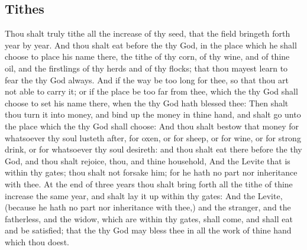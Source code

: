 \begin{biblechapter}
\section*{Tithes}
\verse Thou shalt truly tithe all the increase of thy seed, that the field bringeth forth year by year.
\verse And thou shalt eat before the \LORD thy God, in the place which he shall choose to place his name there, the tithe of thy corn, of thy wine, and of thine oil, and the firstlings of thy herds and of thy flocks; that thou mayest learn to fear the \LORD thy God always.
\verse And if the way be too long for thee, so that thou art not able to carry it; or if the place be too far from thee, which the \LORD thy God shall choose to set his name there, when the \LORD thy God hath blessed thee:
\verse Then shalt thou turn it into money, and bind up the money in thine hand, and shalt go unto the place which the \LORD thy God shall choose:
\verse And thou shalt bestow that money for whatsoever thy soul lusteth after, for oxen, or for sheep, or for wine, or for strong drink, or for whatsoever thy soul desireth: and thou shalt eat there before the \LORD thy God, and thou shalt rejoice, thou, and thine household,
\verse And the Levite that is within thy gates; thou shalt not forsake him; for he hath no part nor inheritance with thee.
\verse At the end of three years thou shalt bring forth all the tithe of thine increase the same year, and shalt lay it up within thy gates:
\verse And the Levite, (because he hath no part nor inheritance with thee,) and the stranger, and the fatherless, and the widow, which are within thy gates, shall come, and shall eat and be satisfied; that the \LORD thy God may bless thee in all the work of thine hand which thou doest.
\end{biblechapter}


